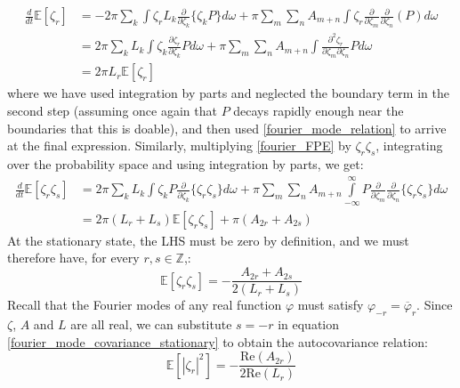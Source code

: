 \begin{align}
\frac{d}{dt}\mathbb{E}[\zeta_r] &= - 2\pi \sum\limits_{k}\int\zeta_rL_k\frac{\partial}{\partial \zeta_k}\{\zeta_k P\}d\omega + \pi\sum\limits_{m}\sum\limits_{n}A_{m+n}\int\zeta_r\frac{\partial}{\partial \zeta_m}\frac{\partial}{\partial \zeta_{n}}(P)d\omega\nonumber\\
&=  2\pi \sum\limits_{k}L_k\int\zeta_k\frac{\partial \zeta_r}{\partial \zeta_k}Pd\omega + \pi\sum\limits_{m}\sum\limits_{n}A_{m+n}\int\frac{\partial^2 \zeta_r}{\partial \zeta_m\partial \zeta_{n}}Pd\omega\nonumber\\
&=  2\pi L_{r}\mathbb{E}[\zeta_r]\label{fourier_mode_mean}
\end{align}
where we have used integration by parts and neglected the boundary term in the second step (assuming once again that $P$ decays rapidly enough near the boundaries that this is doable), and then used \eqref{fourier_mode_relation} to arrive at the final expression. Similarly, multiplying \eqref{fourier_FPE} by $\zeta_r\zeta_s$, integrating over the probability space and using integration by parts, we get:
\begin{align}
\frac{d}{dt}\mathbb{E}[\zeta_r\zeta_s] &= 2\pi \sum\limits_{k}L_{k}\int\zeta_kP\frac{\partial}{\partial \zeta_k}\{\zeta_r\zeta_s\}d\omega + \pi\sum\limits_{m}\sum\limits_{n}A_{m+n}\int\limits_{-\infty}^{\infty}P\frac{\partial}{\partial \zeta_m}\frac{\partial}{\partial \zeta_{n}}\{\zeta_r\zeta_s\}d\omega\nonumber\\
&= 2\pi (L_{r} + L_{s})\mathbb{E}[\zeta_r\zeta_s] + \pi (A_{2r}+A_{2s})\label{fourier_mode_covariance}
\end{align}
At the stationary state, the LHS must be zero by definition, and we must therefore have, for every $r,s \in \mathbb{Z}$,:
\begin{equation}
\label{fourier_mode_covariance_stationary}
\mathbb{E}[\zeta_r\zeta_s] = -   \frac{A_{2r}+A_{2s}}{2(L_{r}+L_{s})}
\end{equation}
Recall that the Fourier modes of any real function $\varphi$ must satisfy $\varphi_{-r} = \overline{\varphi}_r$. Since $\zeta$, $A$ and $L$ are all real, we can substitute $s=-r$ in equation \eqref{fourier_mode_covariance_stationary} to obtain the autocovariance relation:
\begin{equation}
\label{fourier_mode_autocovariance}
\mathbb{E}[|\zeta_r|^2] =- \frac{\mathrm{Re}(A_{2r})}{2\mathrm{Re}(L_{r})}
\end{equation}

